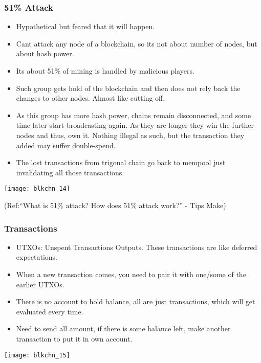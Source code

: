 \begin{frame}[fragile]\frametitle{51\% Attack}
\begin{itemize}
\item Hypothetical but feared that it will happen.
\item Cant attack any node of a blockchain, so its not about number of nodes, but about hash power.
\item Its about 51\% of mining is handled by malicious players. 
\item Such group gets hold of the blockchain and then does not rely back the changes to other nodes. Almost like cutting off.
\item As this group has more hash power, chains remain disconnected, and some time later start broadcasting again. As they are longer they win the further nodes and thus, own it. Nothing illegal as such, but the transaction they added may suffer double-spend. 
\item The lost transactions from trigonal chain go back to mempool just invalidating all those transactions.
\end{itemize}

\begin{center}
\texttt{[image: blkchn\_14]}

{\tiny (Ref:``What is 51\% attack? How does 51\% attack work?'' - Tips Make)}
\end{center}

\end{frame}


\begin{frame}[fragile]\frametitle{Transactions}
\begin{itemize}
\item UTXOs: Unspent Transactions Outputs. These transactions are like deferred expectations.
\item When a new transaction comes, you need to pair it with one/some of the earlier UTXOs.
\item There is no account to hold balance, all are just transactions, which will get evaluated every time.
\item Need to send all amount, if there is some balance left, make another transaction to put it in own account.
\end{itemize}

\begin{center}
\texttt{[image: blkchn\_15]}
\end{center}
\end{frame}

